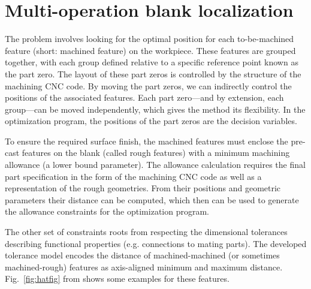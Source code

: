 \documentclass{juliacon}
\begin{document}
\section{Multi-operation blank localization}
\label{sec:algo}

The problem involves looking for the optimal position for each to-be-machined feature (short: machined feature) on the workpiece.
These features are grouped together, with each group defined relative to a specific reference point known as the part zero.
The layout of these part zeros is controlled by the structure of the machining CNC code.
By moving the part zeros, we can indirectly control the positions of the associated features.
Each part zero—and by extension, each group—can be moved independently, which gives the method its flexibility.
In the optimization program, the positions of the part zeros are the decision variables.

To ensure the required surface finish, the machined features must enclose the pre-cast features on the blank (called rough features) with a minimum machining allowance (a lower bound parameter).
The allowance calculation requires the final part specification in the form of the machining CNC code as well as a representation of the rough geometries.
From their positions and geometric parameters their distance can be computed, which then can be used to generate the allowance constraints for the optimization program.

The other set of constraints roots from respecting the dimensional tolerances describing functional properties (e.g. connections to mating parts).
The developed tolerance model encodes the distance of machined-machined (or sometimes machined-rough) features as axis-aligned minimum and maximum distance.
Fig.~\ref{fig:hatfig} from \cite{cserteg:2023_Annals} shows some examples for these features.
\end{document}
